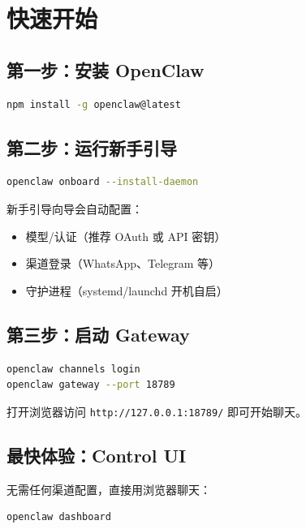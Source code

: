 \section{快速开始}

\subsection*{第一步：安装 OpenClaw}

\begin{lstlisting}[language=bash]
npm install -g openclaw@latest
\end{lstlisting}

\subsection*{第二步：运行新手引导}

\begin{lstlisting}[language=bash]
openclaw onboard --install-daemon
\end{lstlisting}

新手引导向导会自动配置：
\begin{itemize}
  \item 模型/认证（推荐 OAuth 或 API 密钥）
  \item 渠道登录（WhatsApp、Telegram 等）
  \item 守护进程（systemd/launchd 开机自启）
\end{itemize}

\subsection*{第三步：启动 Gateway}

\begin{lstlisting}[language=bash]
openclaw channels login
openclaw gateway --port 18789
\end{lstlisting}

打开浏览器访问 \texttt{http://127.0.0.1:18789/} 即可开始聊天。

\subsection*{最快体验：Control UI}

无需任何渠道配置，直接用浏览器聊天：

\begin{lstlisting}[language=bash]
openclaw dashboard
\end{lstlisting}

